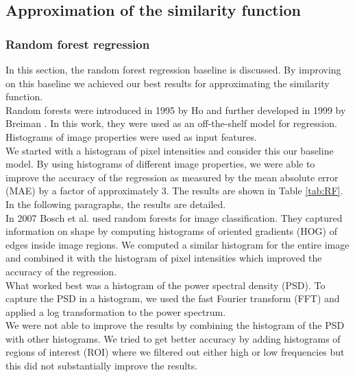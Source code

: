 \documentclass[10pt,conference,compsocconf]{IEEEtran}
\begin{document}





\subsection{Approximation of the similarity function}
\subsubsection{Random forest regression} 
In this section, the random forest regression baseline is discussed. By improving on this baseline we achieved our best results for approximating the similarity function. \\
Random forests were introduced in 1995 by Ho \cite{Ho} and further developed in 1999 by Breiman \cite{Breiman}. In this work, they were used as an off-the-shelf model for regression. Histograms of image properties were used as input features. \\
We started with a histogram of pixel intensities and consider this our baseline model. By using histograms of different image properties, we were able to improve the accuracy of the regression as measured by the mean absolute error (MAE) by a factor of approximately 3. The results are shown in Table \ref{tab:RF}. In the following paragraphs, the results are detailed. \\ 
In 2007 Bosch et al. \cite{Bosch} used random forests for image classification. They captured information on shape by computing histograms of oriented gradients (HOG) of edges inside image regions. We computed a similar histogram for the entire image and combined it with the histogram of pixel intensities which improved the accuracy of the regression. \\ 
What worked best was a histogram of the power spectral density (PSD). To capture the PSD in a histogram, we used the fast Fourier transform (FFT) and applied a log transformation to the power spectrum. \\
We were not able to improve the results by combining the histogram of the PSD with other histograms. We tried to get better accuracy by adding histograms of regions of interest (ROI) where we filtered out either high or low frequencies but this did not substantially improve the results. \\
\end{document}
